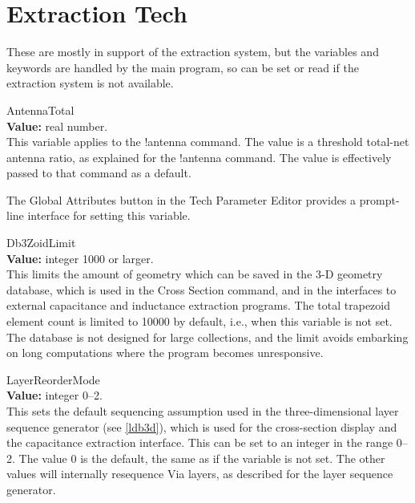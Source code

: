 \section{Extraction Tech}
\label{extech}

These are mostly in support of the extraction system, but the
variables and keywords are handled by the main program, so can be set
or read if the extraction system is not available.

\begin{description}
\item{\et AntennaTotal}\\
{\bf Value:} real number.\\
This variable applies to the {\cb !antenna} command.  The value is a
threshold total-net antenna ratio, as explained for the {\cb !antenna}
command.  The value is effectively passed to that command as a
default.

The {\cb Global Attributes} button in the {\cb Tech Parameter Editor}
provides a prompt-line interface for setting this variable.

\item{\et Db3ZoidLimit}\\
{\bf Value:} integer 1000 or larger.\\
This limits the amount of geometry which can be saved in the 3-D
geometry database, which is used in the {\cb Cross Section} command,
and in the interfaces to external capacitance and inductance
extraction programs.  The total trapezoid element count is limited to
10000 by default, i.e., when this variable is not set.  The database
is not designed for large collections, and the limit avoids embarking
on long computations where the program becomes unresponsive.

\item{\et LayerReorderMode}\\
{\bf Value:} integer 0--2.\\
This sets the default sequencing assumption used in the
three-dimensional layer sequence generator (see \ref{ldb3d}), which is
used for the cross-section display and the capacitance extraction
interface.  This can be set to an integer in the range 0--2.  The
value 0 is the default, the same as if the variable is not set.  The
other values will internally resequence {\vt Via} layers, as described
for the layer sequence generator.


\end{description}
